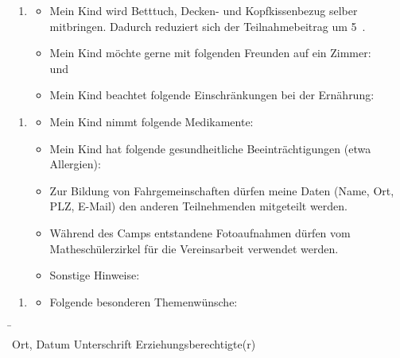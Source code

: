 \documentclass[13pt]{zettel}
\newenvironment{themabox}[1]{%
  \vspace{-0.8em}%
  \begin{enumerate}[labelindent=0pt,labelwidth=2.35cm,itemindent=0em,leftmargin=!,align=left]
    \item[\textbf{#1}]
      \begin{itemize}
}{\end{itemize}\end{enumerate}\vspace{-0.3em}}
\begin{document}
\begin{shaded}\begin{themabox}{Unterkunft}
\item Mein Kind wird Betttuch, Decken- und Kopfkissenbezug selber mitbringen.
Dadurch reduziert sich der Teilnahmebeitrag um 5~\texteuro{}.
\item Mein Kind möchte gerne mit folgenden Freunden auf ein Zimmer: \\[1em] \freistMittel \quad und \quad \freistMittel
\item Mein Kind beachtet folgende Einschränkungen bei der Ernährung: \\[1em]
\freist{13cm}
\end{themabox}\end{shaded}
\vspace{-0.5cm}

\begin{shaded}\begin{themabox}{Sonstiges}
\item Mein Kind nimmt folgende Medikamente:
\freist{5.4cm}
\item Mein Kind hat folgende gesundheitliche Beeinträchtigungen
(etwa Allergien): \\[1em] \freist{13cm}
\item Zur Bildung von Fahrgemeinschaften dürfen meine Daten (Name, Ort, PLZ,
E-Mail) den anderen Teilnehmenden mitgeteilt werden.
\item Während des Camps entstandene Fotoaufnahmen dürfen
vom Matheschülerzirkel für die Vereinsarbeit verwendet werden.
\item Sonstige Hinweise: \freist{10cm}
\end{themabox}
\end{shaded}
\vspace{-0.5cm}

\begin{shaded}\begin{themabox}{Mathe}
\item[] Folgende besonderen Themenwünsche:
\freist{6.85cm}
\end{themabox}
\end{shaded}

\begin{tabbing}
\freistMittel \qquad\qquad \= \kill
\freistMittel \> \freistLaenger \\
Ort, Datum \> Unterschrift Erziehungsberechtigte(r)
\end{tabbing}
\end{document}
